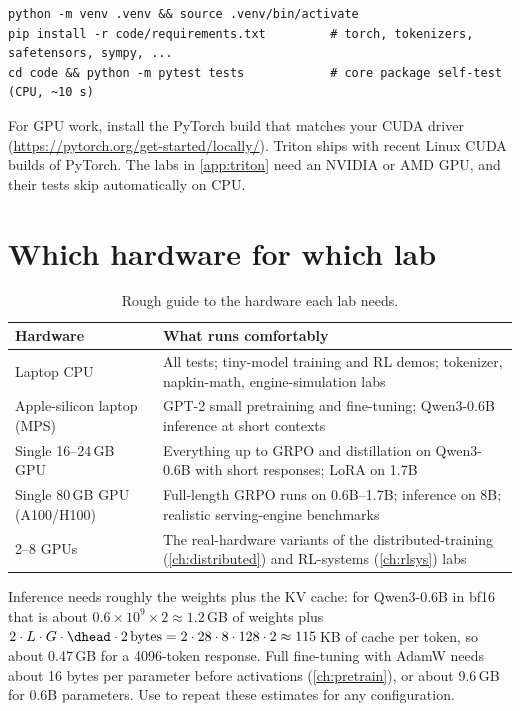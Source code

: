 \begin{lstlisting}[style=shell]
python -m venv .venv && source .venv/bin/activate
pip install -r code/requirements.txt         # torch, tokenizers, safetensors, sympy, ...
cd code && python -m pytest tests            # core package self-test (CPU, ~10 s)
\end{lstlisting}
For GPU work, install the PyTorch build that matches your CUDA driver
(\url{https://pytorch.org/get-started/locally/}). Triton ships with recent Linux CUDA builds of
PyTorch. The labs in \cref{app:triton} need an NVIDIA or AMD GPU, and their tests skip
automatically on CPU.

\section{Which hardware for which lab}

\begin{table}[h]
\centering\small
\begin{tabularx}{\linewidth}{@{}lX@{}}
\toprule
\textbf{Hardware} & \textbf{What runs comfortably}\\
\midrule
Laptop CPU & All tests; tiny-model training and RL demos; tokenizer, napkin-math, engine-simulation labs\\
Apple-silicon laptop (MPS) & GPT-2 small pretraining and fine-tuning; Qwen3-0.6B inference at short contexts\\
Single 16--24\,GB GPU & Everything up to GRPO and distillation on Qwen3-0.6B with short responses; LoRA on 1.7B\\
Single 80\,GB GPU (A100/H100) & Full-length GRPO runs on 0.6B--1.7B; inference on 8B; realistic serving-engine benchmarks\\
2--8 GPUs & The real-hardware variants of the distributed-training (\cref{ch:distributed}) and RL-systems (\cref{ch:rlsys}) labs\\
\bottomrule
\end{tabularx}
\caption{Rough guide to the hardware each lab needs.}
\end{table}

\begin{napkinmath}
Inference needs roughly the weights plus the KV cache: for Qwen3-0.6B in bf16 that is
about $0.6\times10^9\times 2\approx 1.2$\,GB of weights plus
$2\cdot L\cdot G\cdot \dhead\cdot 2\,\text{bytes} = 2\cdot28\cdot8\cdot128\cdot2 \approx 115$\,KB
of cache per token, so about 0.47\,GB for a 4096-token response. Full fine-tuning with AdamW
needs about 16 bytes per parameter before activations (\cref{ch:pretrain}), or about 9.6\,GB for
0.6B parameters. Use  to repeat these estimates for any configuration.
\end{napkinmath}

